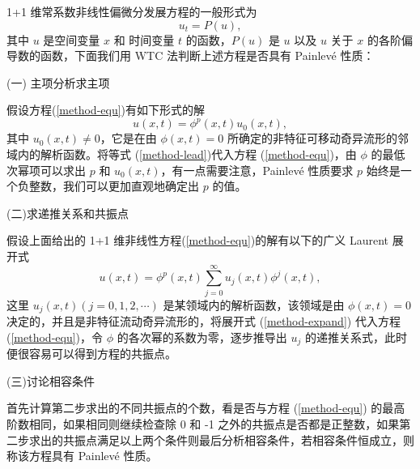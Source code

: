 1+1 维常系数非线性偏微分发展方程的一般形式为
\begin{equation}
u_t=P(u),\label{method-equ}
\end{equation}
其中 $u$ 是空间变量 $x$ 和 时间变量 $t$ 的函数，$P(u)$ 是 $u$ 以及 $u$ 关于 $x$ 的各阶偏导数的函数，下面我们用 WTC 法判断上述方程是否具有 Painlev\'{e} 性质：

(一) 主项分析求主项

假设方程(\ref{method-equ})有如下形式的解
\begin{equation}
u(x,t)=\phi^p(x,t) u_0(x,t),\label{method-lead}
\end{equation}
其中 $u_0(x,t)\neq 0$，它是在由 $\phi(x,t)=0$ 所确定的非特征可移动奇异流形的邻域内的解析函数。将等式 (\ref{method-lead})代入方程 (\ref{method-equ})，由 $\phi$ 的最低次幂项可以求出 $p$ 和 $u_0(x,t)$，有一点需要注意，Painlev\'{e} 性质要求 $p$ 始终是一个负整数，我们可以更加直观地确定出 $p$ 的值。

(二)求递推关系和共振点

假设上面给出的 1+1 维非线性方程(\ref{method-equ})的解有以下的广义 Laurent 展开式
\begin{equation}
u(x,t)=\phi^p(x,t)\sum_{j=0}^\infty u_j(x,t) \phi^j(x,t),\label{method-expand}
\end{equation}
这里 $u_j(x,t)(j=0,1,2,\cdots)$ 是某领域内的解析函数，该领域是由 $\phi(x,t)=0$ 决定的，并且是非特征流动奇异流形的，将展开式 (\ref{method-expand}) 代入方程 (\ref{method-equ})，令 $\phi$ 的各次幂的系数为零，逐步推导出 $u_j$ 的递推关系式，此时便很容易可以得到方程的共振点。

(三)讨论相容条件

首先计算第二步求出的不同共振点的个数，看是否与方程 (\ref{method-equ}) 的最高阶数相同，如果相同则继续检查除 0 和 -1 之外的共振点是否都是正整数，如果第二步求出的共振点满足以上两个条件则最后分析相容条件，若相容条件恒成立，则称该方程具有 Painlev\'{e} 性质。

